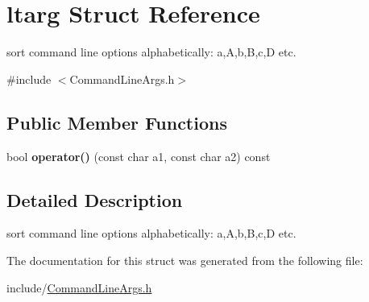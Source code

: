 \hypertarget{structltarg}{}\section{ltarg Struct Reference}
\label{structltarg}


sort command line options alphabetically\+: a,A,b,B,c,D etc.  




{\ttfamily \#include $<$Command\+Line\+Args.\+h$>$}

\subsection*{Public Member Functions}
\begin{DoxyCompactItemize}
\item 
\mbox{\label{structltarg_a87b6eddc57c2a991373e0bda64910bbd}} 
bool {\bfseries operator()} (const char a1, const char a2) const
\end{DoxyCompactItemize}


\subsection{Detailed Description}
sort command line options alphabetically\+: a,A,b,B,c,D etc. 

The documentation for this struct was generated from the following file\+:\begin{DoxyCompactItemize}
\item 
include/\hyperlink{CommandLineArgs_8h}{Command\+Line\+Args.\+h}\end{DoxyCompactItemize}
